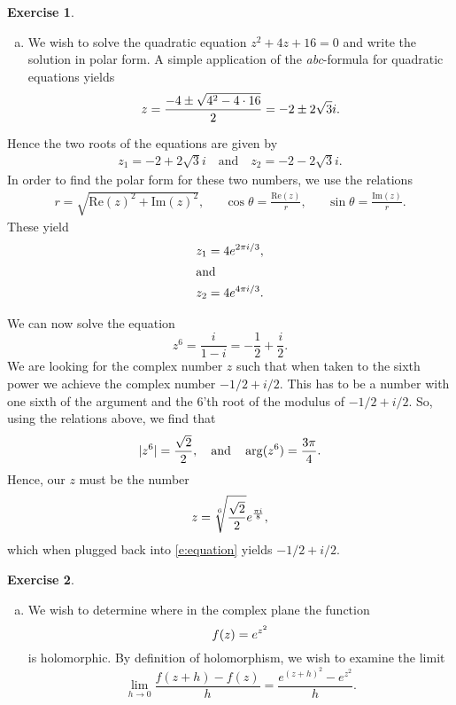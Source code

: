 \documentclass[10pt]{amsart}
\newcommand{\Rez}[1]{\mathrm{Re}(#1)}
\newcommand{\Imz}[1]{\mathrm{Im}(#1)}
\theoremstyle{definition}
\newtheorem{exercise}{Exercise}
\begin{document}
\begin{exercise}\hfill
  \begin{enumerate}[a)]
    \item We wish to solve the quadratic equation $z^2 + 4z + 16 = 0$ and write the solution in polar form.
      A simple application of the \emph{abc}-formula for quadratic equations yields
      \begin{equation}
        \notag
        z = \frac{-4 \pm \sqrt{4^2 - 4\cdot 16}}{2} = -2 \pm 2\sqrt{3}i.
      \end{equation}
  \end{enumerate} 
  Hence the two roots of the equations are given by
  \begin{align*}
    z_1 = -2 + 2\sqrt{3}i \quad \text{and} \quad z_2 = -2 - 2\sqrt{3}i.
  \end{align*}
  In order to find the polar form for these two numbers, we use the relations
  \begin{align*}
    r = \sqrt{\Rez{z}^2 + \Imz{z}^2}, && \cos\theta = \frac{\Rez{z}}{r}, && \sin\theta = \frac{\Imz{z}}{r}.
  \end{align*}
  These yield
  \begin{align*}
    z_1 = 4e^{2\pi i /3}, \\
    \intertext{and}
    z_2 = 4e^{4\pi i/ 3}.
  \end{align*}
  \item We can now solve the equation
    \begin{equation}
      \label{e:equation} 
      z^6 = \frac{i}{1-i} = -\frac{1}{2} + \frac{i}{2}.
    \end{equation}
    We are looking for the complex number $z$ such that when taken to the sixth
    power we achieve the complex number $-1/2 + i/2$. This has to be a number
    with one sixth of the argument and the 6'th root of the modulus of $-1/2 +
    i/2$.
    So, using the relations above, we find that
    \begin{equation}
      \notag
      |z^6| = \frac{\sqrt{2}}{2}, \quad \text{and} \quad \arg(z^6) = \frac{3\pi}{4}.
    \end{equation}
    Hence, our $z$ must be the number
    \begin{equation}
      \notag
      z = \sqrt[6]{\frac{\sqrt{2}}{2}}e^{\frac{\pi i}{8}}, 
    \end{equation}
    which when plugged back into \cref{e:equation} yields $-1/2 + i/2$.
\end{exercise}

\begin{exercise}\hfill
  \begin{enumerate}[a)]
    \item We wish to determine where in the complex plane the function
      \begin{equation}
        \notag
        f(z) = e^{z^2}
      \end{equation}
      is holomorphic. By definition of holomorphism, we wish to examine the limit
      \[
        \lim_{h \to 0} \frac{f(z + h) - f(z)}{h} = \frac{e ^ {(z + h)^2} - e^{z^2}}{h}.
      \]
  \end{enumerate} 
\end{exercise}
\end{document}
